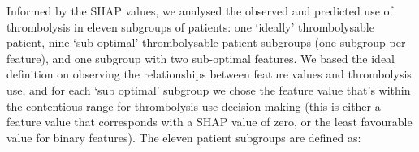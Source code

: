 Informed by the SHAP values, we analysed the observed and predicted use of thrombolysis in eleven subgroups of patients: one `ideally' thrombolysable patient, nine `sub-optimal' thrombolysable patient subgroups (one subgroup per feature), and one subgroup with two sub-optimal features. We based the ideal definition on observing the relationships between feature values and thrombolysis use, and for each `sub optimal' subgroup we chose the feature value that's within the contentious range for thrombolysis use decision making (this is either a feature value that corresponds with a SHAP value of zero, or the least favourable value for binary features). The eleven patient subgroups are defined as:


\iffalse
We analysed the observed and predicted use of thrombolysis in subgroups of patients. One `ideally' thrombolysable patient, and nine (one per feature) 'sub-optimal' thrombolysable patient groups (selecting patients based on one feature set to a sub-optimal value). We based the ideal definition on observing the relationships between feature values and thrombolysis use, and chose the 'sub-optimal' feature value by choosing a value that's within the contentious range for decision making (a feature value that corresponds with a SHAP value of zero, or the least favourable for binary features). The ten sub-groups are defined as:
\fi

